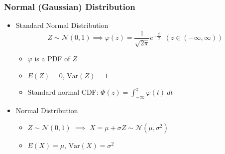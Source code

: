 \subsubsection*{Normal (Gaussian) Distribution}
\begin{itemize}
    \item Standard Normal Distribution
    \begin{equation}
        Z\sim\mathcal{N}(0,1)\implies \varphi(z)=\frac{1}{\sqrt{2\pi}}e^{-\frac{z^2}{2}}~~(z\in(-\infty,\infty))
    \end{equation}
    \begin{itemize}
        \item $\varphi$ is a PDF of $Z$
        \item $E(Z)=0$, $\text{Var}(Z)=1$
        \item Standard normal CDF: $\Phi(z)=\int_{-\infty}^z\varphi(t)~dt$
    \end{itemize}
    \item Normal Distribution
    \begin{itemize}
        \item $Z\sim\mathcal{N}(0,1)$ $\implies$ $X=\mu+\sigma Z\sim\mathcal{N}(\mu,\sigma^2)$
        \item $E(X)=\mu$, $\text{Var}(X)=\sigma^2$
    \end{itemize}
\end{itemize}


